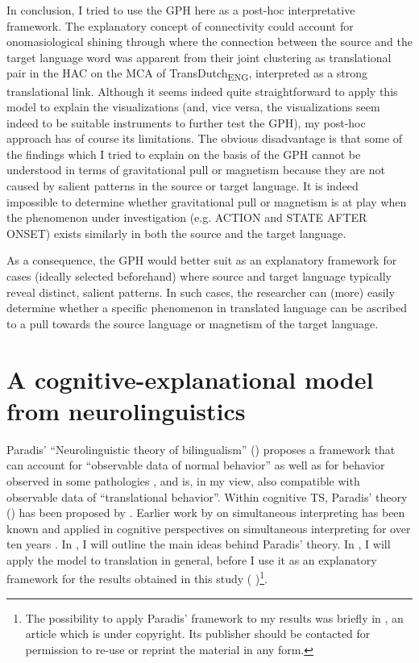 In conclusion, I tried to use the GPH here as a post-hoc interpretative framework. The explanatory concept of connectivity could account for onomasiological shining through where the connection between the source and the target language word was apparent from their joint clustering as translational pair in the HAC on the MCA of TransDutch\textsubscript{ENG}, interpreted as a strong translational link. Although it seems indeed quite straightforward to apply this model to explain the visualizations (and, vice versa, the visualizations seem indeed to be suitable instruments to further test the GPH), my post-hoc approach has of course its limitations. The obvious disadvantage is that some of the findings which I tried to explain on the basis of the GPH cannot be understood in terms of gravitational pull or magnetism because they are not caused by salient patterns in the source or target language. It is indeed impossible to determine whether gravitational pull or magnetism is at play when the phenomenon under investigation (e.g. ACTION and STATE AFTER ONSET) exists similarly in both the source and the target language.

As a consequence, the GPH would better suit as an explanatory framework for cases (ideally selected beforehand) where source and target language typically reveal distinct, salient patterns. In such cases, the researcher can (more) easily determine whether a specific phenomenon in translated language can be ascribed to a pull towards the source language or magnetism of the target language.

\section{A cognitive-explanational model from neurolinguistics}
\label{sec:5.3}  
Paradis’ “Neurolinguistic theory of bilingualism” (\citeyear{paradis_neurolinguistic_2004}) proposes a framework that can account for “observable data of normal behavior” as well as for behavior observed in some pathologies \citep[225]{paradis_neurolinguistic_2004}, and is, in my view, also compatible with observable data of “translational behavior”. Within cognitive TS, Paradis’ theory (\citeyear{paradis_neurolinguistic_2004}) has been proposed by \citet{house_towards_2013}. Earlier work by \citet{ellis_neurolinguistic_1994, englund_dimitrova_prerequisites_2000} on simultaneous interpreting has been known and applied in cognitive perspectives on simultaneous interpreting for over ten years \citep{christoffels_cognitive_2004, kroll_simultaneous_2005, de_groot_language_2006}. In , I will outline the main ideas behind Paradis’ theory. In , I will apply the model to translation in general, before I use it as an explanatory framework for the results obtained in this study ( )\footnote{The possibility to apply Paradis’ framework to my results was briefly in \citet{VandevoordeEtAl2017}, an article which is under copyright. Its publisher should be contacted for permission to re-use or reprint the material in any form.}.

